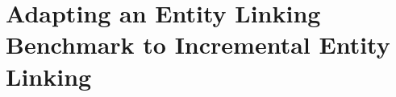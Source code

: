 \section[Adapting an Entity Linking Benchmark to Incremental Entity Linking][Adapting an \acs{nel} Benchmark to \acs{inel}]{Adapting an Entity Linking Benchmark to Incremental Entity Linking}
\label{sec:ijckg}




%
%

